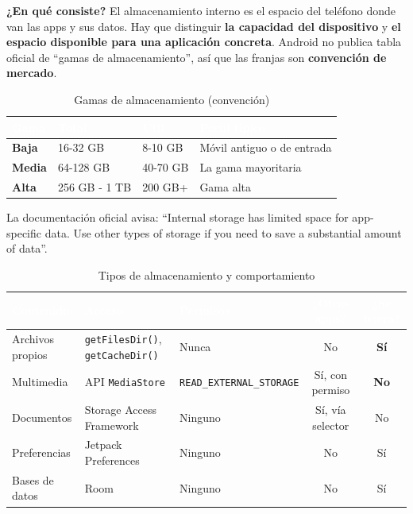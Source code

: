 \documentclass[11pt,a4paper]{article}
\newcommand{\code}[1]{\texttt{\color{primary}#1}}
\newcommand{\campo}[1]{\textbf{\color{primary}#1}}
\begin{document}
	\campo{¿En qué consiste?}
	El almacenamiento interno es el espacio del teléfono donde van las apps y sus datos. Hay que distinguir \textbf{la capacidad del dispositivo} y \textbf{el espacio disponible para una aplicación concreta}. Android no publica tabla oficial de \enquote{gamas de almacenamiento}, así que las franjas son \textbf{convención de mercado}.
	
	\begin{table}[htbp]
		\centering
		\small
		\begin{tabularx}{\textwidth}{@{}l l l >{\RaggedRight\arraybackslash}X@{}}
			\toprule
			\rowcolor{primary}
			\textcolor{white}{\sffamily\bfseries Gama} & \textcolor{white}{\sffamily\bfseries Total} & \textcolor{white}{\sffamily\bfseries Útil} & \textcolor{white}{\sffamily\bfseries Perfil típico} \\
			\midrule
			\textbf{Baja} & 16-32 GB & 8-10 GB & Móvil antiguo o de entrada \\
			\rowcolor{soft}
			\textbf{Media} & 64-128 GB & 40-70 GB & La gama mayoritaria \\
			\textbf{Alta} & 256 GB - 1 TB & 200 GB+ & Gama alta \\
			\bottomrule
		\end{tabularx}
		\caption{Gamas de almacenamiento (convención)}
	\end{table}
	
	La documentación oficial avisa: \enquote{Internal storage has limited space for app-specific data. Use other types of storage if you need to save a substantial amount of data}.
	
	\begin{table}[htbp]
		\centering
		\footnotesize
		\begin{tabularx}{\textwidth}{@{}>{\RaggedRight\arraybackslash}p{2.8cm} >{\RaggedRight\arraybackslash}p{3cm} >{\RaggedRight\arraybackslash}p{3cm} c c@{}}
			\toprule
			\rowcolor{primary}
			\textcolor{white}{\sffamily\bfseries Contenido} & \textcolor{white}{\sffamily\bfseries Acceso} & \textcolor{white}{\sffamily\bfseries Permisos} & \textcolor{white}{\sffamily\bfseries ¿Otras apps?} & \textcolor{white}{\sffamily\bfseries ¿Se borra?} \\
			\midrule
			Archivos propios & \code{getFilesDir()}, \code{getCacheDir()} & Nunca & No & \textbf{Sí} \\
			\rowcolor{soft}
			Multimedia & API \code{MediaStore} & \code{READ\_EXTERNAL\_STORAGE} & Sí, con permiso & \textbf{No} \\
			Documentos & Storage Access Framework & Ninguno & Sí, vía selector & No \\
			\rowcolor{soft}
			Preferencias & Jetpack Preferences & Ninguno & No & Sí \\
			Bases de datos & Room & Ninguno & No & Sí \\
			\bottomrule
		\end{tabularx}
		\caption{Tipos de almacenamiento y comportamiento}
	\end{table}
	
\end{document}
